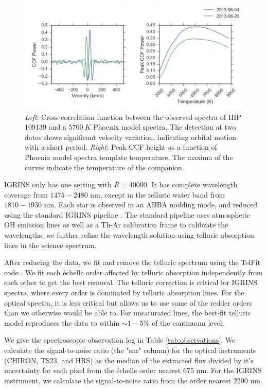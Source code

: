 \documentclass{emulateapj}
\begin{document}
\begin{figure}
\includegraphics[width=\textwidth]{HIP_109139.pdf}
\caption{\emph{Left}: Cross-correlation function between the observed spectra of HIP 109139 and a $5700\ K$ Phoenix model spectra. The detection at two dates shows significant velocity variation, indicating orbital motion with a short period. \emph{Right}: Peak CCF height as a function of Phoenix model spectra template temperature. The maxima of the curves indicate the temperature of the companion.}
\label{fig:ccf}
\end{figure}

IGRINS only has one setting with $R = 40000$. It has complete wavelength coverage from $1475-2480$ nm, except in the telluric water band from $1810 - 1930$ nm. Each star is observed in an ABBA nodding mode, and reduced using the standard IGRINS pipeline \citep{IGRINS_plp_v2}. The standard pipeline uses atmospheric OH emission lines as well as a Th-Ar calibration frame to calibrate the wavelengths; we further refine the wavelength solution using telluric absorption lines in the science spectrum.

After reducing the data, we fit and remove the telluric spectrum using the TelFit code \citep{Gullikson2014}. We fit each \'echelle order affected by telluric absorption independently from each other to get the best removal. The telluric correction is critical for IGRINS spectra, where every order is dominated by telluric absorption lines. For the optical spectra, it is less critical but allows us to use some of the redder orders than we otherwise would be able to. For unsaturated lines, the best-fit telluric model reproduces the data to within $\sim 1-5\%$ of the continuum level.

We give the spectroscopic observation log in Table \ref{tab:observations}. We calculate the signal-to-noise ratio (the "snr" column) for the optical instruments (CHIRON, TS23, and HRS) as the median of the extracted flux divided by it's uncertainty for each pixel from the \'echelle order nearest $675$ nm. For the IGRINS instrument, we calculate the signal-to-noise ratio from the order nearest $2200$ nm.
\end{document}
